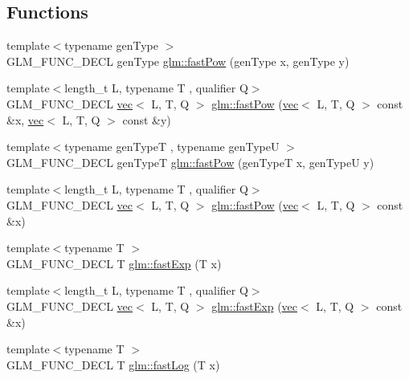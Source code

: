 \subsection*{Functions}
\begin{DoxyCompactItemize}
\item 
{\footnotesize template$<$typename gen\+Type $>$ }\\G\+L\+M\+\_\+\+F\+U\+N\+C\+\_\+\+D\+E\+CL gen\+Type \hyperlink{group__gtx__fast__exponential_ga5340e98a11fcbbd936ba6e983a154d50}{glm\+::fast\+Pow} (gen\+Type x, gen\+Type y)
\item 
{\footnotesize template$<$length\+\_\+t L, typename T , qualifier Q$>$ }\\G\+L\+M\+\_\+\+F\+U\+N\+C\+\_\+\+D\+E\+CL \hyperlink{structglm_1_1vec}{vec}$<$ L, T, Q $>$ \hyperlink{group__gtx__fast__exponential_ga15325a8ed2d1c4ed2412c4b3b3927aa2}{glm\+::fast\+Pow} (\hyperlink{structglm_1_1vec}{vec}$<$ L, T, Q $>$ const \&x, \hyperlink{structglm_1_1vec}{vec}$<$ L, T, Q $>$ const \&y)
\item 
{\footnotesize template$<$typename gen\+TypeT , typename gen\+TypeU $>$ }\\G\+L\+M\+\_\+\+F\+U\+N\+C\+\_\+\+D\+E\+CL gen\+TypeT \hyperlink{group__gtx__fast__exponential_ga7f2562db9c3e02ae76169c36b086c3f6}{glm\+::fast\+Pow} (gen\+TypeT x, gen\+TypeU y)
\item 
{\footnotesize template$<$length\+\_\+t L, typename T , qualifier Q$>$ }\\G\+L\+M\+\_\+\+F\+U\+N\+C\+\_\+\+D\+E\+CL \hyperlink{structglm_1_1vec}{vec}$<$ L, T, Q $>$ \hyperlink{group__gtx__fast__exponential_ga1abe488c0829da5b9de70ac64aeaa7e5}{glm\+::fast\+Pow} (\hyperlink{structglm_1_1vec}{vec}$<$ L, T, Q $>$ const \&x)
\item 
{\footnotesize template$<$typename T $>$ }\\G\+L\+M\+\_\+\+F\+U\+N\+C\+\_\+\+D\+E\+CL T \hyperlink{group__gtx__fast__exponential_gaa3180ac8f96ab37ab96e0cacaf608e10}{glm\+::fast\+Exp} (T x)
\item 
{\footnotesize template$<$length\+\_\+t L, typename T , qualifier Q$>$ }\\G\+L\+M\+\_\+\+F\+U\+N\+C\+\_\+\+D\+E\+CL \hyperlink{structglm_1_1vec}{vec}$<$ L, T, Q $>$ \hyperlink{group__gtx__fast__exponential_ga3ba6153aec6bd74628f8b00530aa8d58}{glm\+::fast\+Exp} (\hyperlink{structglm_1_1vec}{vec}$<$ L, T, Q $>$ const \&x)
\item 
{\footnotesize template$<$typename T $>$ }\\G\+L\+M\+\_\+\+F\+U\+N\+C\+\_\+\+D\+E\+CL T \hyperlink{group__gtx__fast__exponential_gae1bdc97b7f96a600e29c753f1cd4388a}{glm\+::fast\+Log} (T x)

\end{DoxyCompactItemize}
